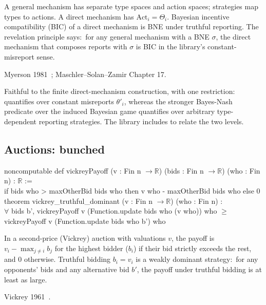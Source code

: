 \Mathematical
A general mechanism has separate type spaces and action spaces;
strategies map types to actions.  A direct mechanism has
$\mathrm{Act}_i = \Theta_i$.  Bayesian incentive compatibility (BIC)
of a direct mechanism is BNE under truthful reporting.  The
revelation principle says:\ for any general mechanism with a BNE
$\sigma$, the direct mechanism that composes reports with $\sigma$
is BIC in the library's constant-misreport sense.

\Textbook
Myerson 1981~\citep{Myerson1981}; Maschler–Solan–Zamir Chapter
17.

\Faithfulness
Faithful to the finite direct-mechanism construction, with one
restriction:\  quantifies over constant
misreports $\theta'_i$, whereas the stronger Bayes-Nash predicate
over the induced Bayesian game quantifies over arbitrary
type-dependent reporting strategies.  The library includes
 to relate the two levels.

\subsection{Auctions: bunched}
\label{sec:supp:auctions}\label{def:vickrey_truthful_dominant}

\begin{leanbox}
noncomputable def vickreyPayoff (v : Fin n $\to \mathbb{R}$) (bids : Fin n $\to \mathbb{R}$) (who : Fin n) : $\mathbb{R}$ :=\\
\bd if bids who > maxOtherBid bids who then v who - maxOtherBid bids who else 0\\[3pt]
theorem vickrey\_truthful\_dominant (v : Fin n $\to \mathbb{R}$) (who : Fin n) :\\
\bd $\forall$ bids b', vickreyPayoff v (Function.update bids who (v who)) who $\ge$\\
\bdd vickreyPayoff v (Function.update bids who b') who
\end{leanbox}

\Mathematical
In a second-price (Vickrey) auction with valuations $v$, the
payoff is $v_i - \max_{j \neq i} b_j$ for the highest bidder
($b_i$) if their bid strictly exceeds the rest, and $0$ otherwise.
Truthful bidding $b_i = v_i$ is a weakly dominant strategy:\ for
any opponents' bids and any alternative bid $b'$, the payoff under
truthful bidding is at least as large.

\Textbook
Vickrey 1961~\citep{Vickrey1961}.

